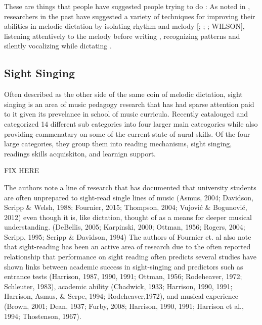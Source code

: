 \documentclass[]{book}
\begin{document}
These are things that people have suggested people trying to do :
As noted in \citet{furbyEffectsPeerTutoring2016}, researchers in the past have suggested a variety of techniques for improving their abilities in melodic dictation by isolating rhythm and melody {[}\citet{bantonRoleVisualAuditory1995}; \citet{blandSightSingingMelodic1984}; \citet{rootMethodicalSightSingingLessons1931}; WILSON{]}, listening attentively to the melody before writing \citep{bantonRoleVisualAuditory1995}, recognizing patterns \citep{bantonRoleVisualAuditory1995, blandSightSingingMelodic1984, rootMethodicalSightSingingLessons1931} and silently vocalizing while dictating \citep{klonoskiImprovingDictationAuralSkills2006}.

\hypertarget{sight-singing}{%
\subsection{Sight Singing}\label{sight-singing}}

Often described as the other side of the same coin of melodic dictation, sight singing is an area of music pedagogy research that has had sparse attention paid to it given its prevelance in school of music curricula.
Recently \citep{fournierCognitiveStrategiesSightsinging2017a} catalouged and categorized 14 different sub categories into four larger main cateogories while also providing commenatary on some of the current state of aural skills.
Of the four large categories, they group them into reading mechanisms, sight singing, readings skills acquiskiton, and learnign support.

FIX HERE

The authors note a line of research that has documented that university students are often unprepared to sight-read single lines of music (Asmus, 2004; Davidson, Scripp \& Welsh, 1988; Fournier, 2015; Thompson, 2004; Vujović \& Bogunović, 2012) even though it is, like dictation, thought of as a means for deeper musical understanding. (DeBellis, 2005; Karpinski, 2000; Ottman, 1956; Rogers, 2004; Scripp, 1995; Scripp \& Davidson, 1994)
The authors of Fournier et. al also note that sight-reading has been an active area of research due to the often reported relationship that performance on sight reading often predicts several studies have shown links between academic success in sight-singing and predictors such as entrance tests (Harrison, 1987, 1990, 1991; Ottman, 1956; Rodeheaver, 1972; Schleuter, 1983), academic ability (Chadwick, 1933; Harrison, 1990, 1991; Harrison, Asmus, \& Serpe, 1994; Rodeheaver,1972), and musical experience (Brown, 2001; Dean, 1937; Furby, 2008; Harrison, 1990, 1991; Harrison et al., 1994; Thostenson, 1967).
\end{document}
